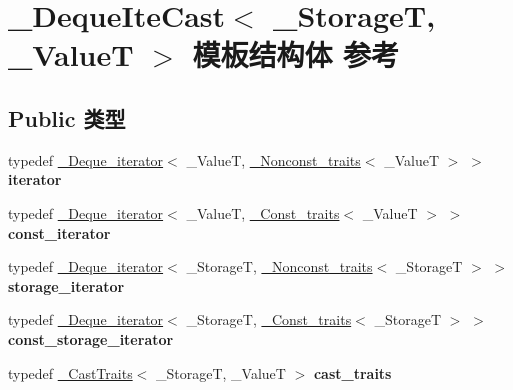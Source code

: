 \hypertarget{struct___deque_ite_cast}{}\section{\+\_\+\+Deque\+Ite\+Cast$<$ \+\_\+\+StorageT, \+\_\+\+ValueT $>$ 模板结构体 参考}
\label{struct___deque_ite_cast}
\subsection*{Public 类型}
\begin{DoxyCompactItemize}
\item 
\mbox{\label{struct___deque_ite_cast_a036d89e63dd767a8c4a8f09cac6571e1}} 
typedef \hyperlink{struct___deque__iterator}{\+\_\+\+Deque\+\_\+iterator}$<$ \+\_\+\+ValueT, \hyperlink{struct___nonconst__traits}{\+\_\+\+Nonconst\+\_\+traits}$<$ \+\_\+\+ValueT $>$ $>$ {\bfseries iterator}
\item 
\mbox{\label{struct___deque_ite_cast_a65133957f7b480e191403a3ff94ad0f2}} 
typedef \hyperlink{struct___deque__iterator}{\+\_\+\+Deque\+\_\+iterator}$<$ \+\_\+\+ValueT, \hyperlink{struct___const__traits}{\+\_\+\+Const\+\_\+traits}$<$ \+\_\+\+ValueT $>$ $>$ {\bfseries const\+\_\+iterator}
\item 
\mbox{\label{struct___deque_ite_cast_a4ed8fbf0613869ed026de3de8b7eaf17}} 
typedef \hyperlink{struct___deque__iterator}{\+\_\+\+Deque\+\_\+iterator}$<$ \+\_\+\+StorageT, \hyperlink{struct___nonconst__traits}{\+\_\+\+Nonconst\+\_\+traits}$<$ \+\_\+\+StorageT $>$ $>$ {\bfseries storage\+\_\+iterator}
\item 
\mbox{\label{struct___deque_ite_cast_af972d38b243f81043e6901bbeb860047}} 
typedef \hyperlink{struct___deque__iterator}{\+\_\+\+Deque\+\_\+iterator}$<$ \+\_\+\+StorageT, \hyperlink{struct___const__traits}{\+\_\+\+Const\+\_\+traits}$<$ \+\_\+\+StorageT $>$ $>$ {\bfseries const\+\_\+storage\+\_\+iterator}
\item 
\mbox{\label{struct___deque_ite_cast_abc4ebbfda08206d05b3912825b270929}} 
typedef \hyperlink{struct___cast_traits}{\+\_\+\+Cast\+Traits}$<$ \+\_\+\+StorageT, \+\_\+\+ValueT $>$ {\bfseries cast\+\_\+traits}
\end{DoxyCompactItemize}
